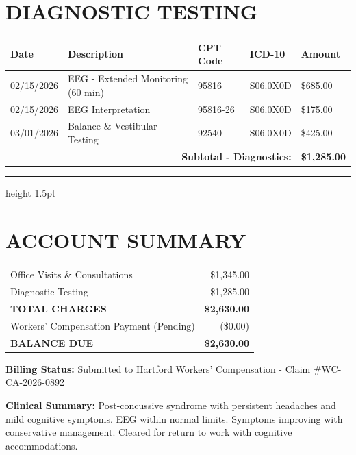 \documentclass[11pt]{article}
\begin{document}
\section*{DIAGNOSTIC TESTING}

\begin{longtable}{@{}p{2cm}p{6cm}p{2cm}p{2cm}p{2.5cm}@{}}
\toprule
\textbf{Date} & \textbf{Description} & \textbf{CPT Code} & \textbf{ICD-10} & \textbf{Amount} \\
\midrule
\endhead

02/15/2026 & EEG - Extended Monitoring (60 min) & 95816 & S06.0X0D & \$685.00 \\
02/15/2026 & EEG Interpretation & 95816-26 & S06.0X0D & \$175.00 \\
03/01/2026 & Balance \& Vestibular Testing & 92540 & S06.0X0D & \$425.00 \\
\midrule
\multicolumn{4}{r}{\textbf{Subtotal - Diagnostics:}} & \textbf{\$1,285.00} \\
\bottomrule
\end{longtable}

\vspace{1em}
\hrule height 1.5pt
\vspace{0.5em}

\section*{ACCOUNT SUMMARY}

\begin{tabular}{@{}p{10cm}r@{}}
Office Visits \& Consultations & \$1,345.00 \\
Diagnostic Testing & \$1,285.00 \\
\midrule
\textbf{TOTAL CHARGES} & \textbf{\$2,630.00} \\
\midrule
Workers' Compensation Payment (Pending) & (\$0.00) \\
\textbf{BALANCE DUE} & \textbf{\$2,630.00} \\
\end{tabular}

\vspace{1.5em}

\textbf{Billing Status:} Submitted to Hartford Workers' Compensation - Claim \#WC-CA-2026-0892

\vspace{0.5em}
\textbf{Clinical Summary:} Post-concussive syndrome with persistent headaches and mild cognitive symptoms. EEG within normal limits. Symptoms improving with conservative management. Cleared for return to work with cognitive accommodations.
\end{document}
